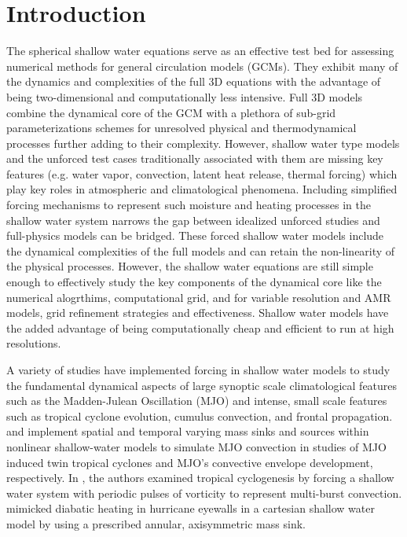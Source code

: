 \section{Introduction}
The spherical shallow water equations serve as an effective test bed for 
assessing numerical methods for general circulation models (GCMs). They 
exhibit many of the dynamics and complexities of the full 3D equations with 
the advantage of being two-dimensional and computationally less intensive.  
Full 3D models combine the dynamical core of the GCM with
 a plethora of sub-grid parameterizations 
schemes for unresolved physical and thermodynamical processes further 
adding to their complexity.  However, shallow water type models and 
the unforced test cases traditionally associated with them \citep{Williamson:1992kx}
are missing key features (e.g. water vapor, convection, latent heat release, 
thermal forcing) which play key roles in atmospheric and 
climatological phenomena. Including simplified forcing mechanisms to represent 
such moisture and heating
processes in the shallow 
water system narrows the gap between idealized unforced studies 
and full-physics models can be bridged. These forced shallow water 
models include the dynamical complexities of the full models and can retain
the non-linearity of the physical processes.  However,
the shallow water equations are still simple enough to effectively study
the key components of the dynamical core like the numerical alogrthims,
computational grid, and for variable resolution and AMR models, grid refinement
strategies and effectiveness. Shallow water models have the added advantage of 
being computationally cheap and efficient to run at high resolutions.

A variety of studies have implemented forcing in shallow water models to study
 the fundamental dynamical aspects of large synoptic
scale climatological features such as the Madden-Julean Oscillation (MJO)
and intense, small scale features such as tropical cyclone 
evolution, cumulus convection, and frontal propagation.
\cite{ferreira1996dynamical} and \cite{yang2013triggered} implement
spatial and temporal varying mass sinks and sources within nonlinear 
shallow-water models to simulate MJO convection in studies of MJO
induced twin tropical cyclones and MJO's convective envelope 
development, respectively. In \cite{enagonio2001tropical}, 
the authors examined tropical cyclogenesis
by forcing a shallow water system with periodic pulses of vorticity  to represent multi-burst convection.
 \cite{hendricks2014hurricane} mimicked diabatic heating in hurricane 
eyewalls in a cartesian shallow water model by using a prescribed annular,
 axisymmetric mass sink.

